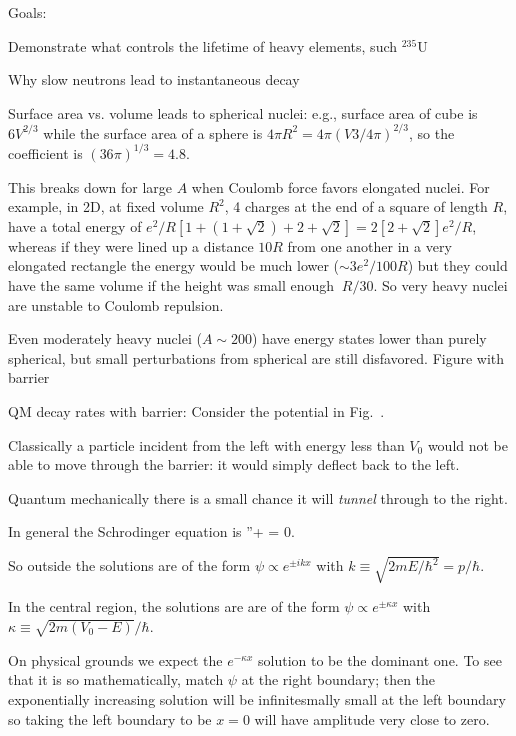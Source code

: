\documentclass[11pt]{book}
\begin{document}

Goals:
\bei
\item Demonstrate what controls the lifetime of heavy elements, such $^{235}$U 
\item Why slow neutrons lead to instantaneous decay
\eei


\bee
\item Surface area vs. volume leads to spherical nuclei: e.g., surface area of cube is $6V^{2/3}$ while the surface area of a sphere is $4\pi R^2 = 4\pi (V3/4\pi)^{2/3}$, so the coefficient is $(36\pi)^{1/3}=4.8$.
\item This breaks down for large $A$ when Coulomb force favors elongated nuclei. For example, in 2D, at fixed volume $R^2$, 4 charges at the end of a square of length $R$, have a total energy of $e^2/R[1+(1+\sqrt{2}) + 2 +\sqrt{2}]=2[2+\sqrt{2}]e^2/R$, whereas if they were lined up a distance $10R$ from one another in a very elongated rectangle the energy would be much lower ($\sim 3e^2/100R$) but they could have the same volume if the height was small enough $~R/30$. So very heavy nuclei are unstable to Coulomb repulsion. 
\item Even moderately heavy nuclei ($A\sim 200$) have energy states lower than purely spherical, but small perturbations from spherical are still disfavored. Figure with barrier
\item QM decay rates with barrier: Consider the potential in Fig.~.
\bei
\item Classically a particle incident from the left with energy less than $V_0$ would not be able to move through the barrier: it would simply deflect back to the left. 
\item Quantum mechanically there is a small chance it will {\it tunnel} through to the right.
\item In general the Schrodinger equation is
\be
\psi''+ = 0.\ee
\item So outside the solutions are of the form $\psi\propto e^{\pm ikx}$ with $k\equiv \sqrt{2mE/\hbar^2}=p/\hbar$. 
\item In the central region, the solutions are are of the form $\psi \propto e^{\pm \kappa x}$ with $\kappa\equiv \sqrt{2m(V_0-E)}/\hbar$.
\item On physical grounds we expect the $e^{-\kappa x}$ solution to be the dominant one. To see that it is so mathematically, match $\psi$ at the right boundary; then the exponentially increasing solution will be infinitesmally small at the left boundary so taking the left boundary to be $x=0$ will have amplitude very close to zero.
\end{document}
